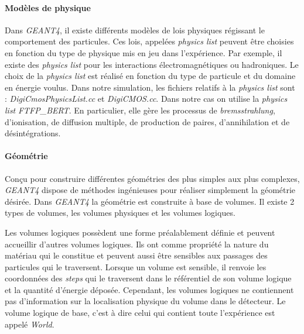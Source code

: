    

    \paragraph{Mod\`eles de physique}
    
    Dans \textit{GEANT4}, il existe différents mod\`eles de lois physiques r\'egissant le comportement des particules. Ces lois, appel\'ees \textit{physics list} peuvent être choisies en fonction du type de physique mis en jeu dans l'exp\'erience. Par exemple, il existe des \textit{physics list} pour les interactions \'electromagn\'etiques ou hadroniques. Le choix de la \textit{physics list} est r\'ealis\'e en fonction du type de particule et du domaine en \'energie voulus. Dans notre simulation, les fichiers relatifs \`a la \textit{physics list} sont : \textit{DigiCmosPhysicsList.cc} et \textit{DigiCMOS.cc}. Dans notre cas on utilise la \textit{physics list} \textit{FTFP\_BERT}. En particulier, elle g\`ere les processus de \textit{bremsstrahlung}, d'ionisation, de diffusion multiple, de production de paires, d'annihilation et de d\'esint\'egrations.  \\
    
    \paragraph{Géométrie}
   
    Con\c{c}u pour construire différentes g\'eom\'etries des plus simples aux plus complexes, \textit{GEANT4} dispose de m\'ethodes ing\'enieuses pour r\'ealiser simplement la g\'eom\'etrie d\'esir\'ee. Dans \textit{GEANT4} la g\'eom\'etrie est construite \`a base de volumes. Il existe 2 types de volumes, les volumes physiques et les volumes logiques. 
    
    \medskip
    
    Les volumes logiques poss\`edent une forme pr\'ealablement définie et peuvent accueillir d'autres volumes logiques. Ils ont comme propri\'et\'e la nature du mat\'eriau qui le constitue et peuvent aussi être sensibles aux passages des particules qui le traversent. Lorsque un volume est sensible, il renvoie les coordonn\'ees des \textit{steps} qui le traversent dans le r\'ef\'erentiel de son volume logique et la quantit\'e d'\'energie d\'epos\'ee. Cependant, les volumes logiques ne contiennent pas d'information sur la localisation physique du volume dans le d\'etecteur. Le volume logique de base, c'est \`a dire celui qui contient toute l'exp\'erience est appel\'e \textit{World}.
    
